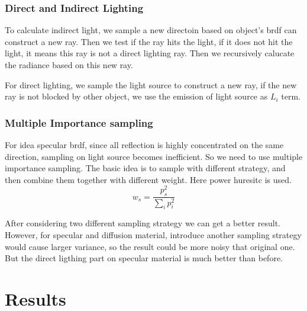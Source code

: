 \documentclass[acmtog]{acmart}
\begin{document}
\subsubsection{Direct and Indirect Lighting}
To calculate indirect light, we sample a new directoin based on object's brdf can construct a new ray. Then we test if the ray hits the light, if it does not hit the light, it means this ray is not a direct lighting ray. Then we recursively calucate the radiance based on this new ray.

For direct lighting, we sample the light source to construct a new ray, if the new ray is not blocked by other object, we use the emission of light source as $L_i$ term.

\subsubsection{Multiple Importance sampling}
For idea specular brdf, since all reflection is highly concentrated on the same direction, sampling on light source becomes inefficient. So we need to use multiple importance sampling. The basic idea is to sample with different strategy, and then combine them together with different weight.
Here power huresitc is used.
\[w_s = \frac{p_s^2}{\sum_i p_i^2}\]

After considering two different sampling strategy we can get a better result. However, for specular and diffusion material, introduce another sampling strategy would cause larger variance, so the result could be more noisy that original one. But the direct ligthing part on specular material is much better than before.

\section{Results}
\end{document}

